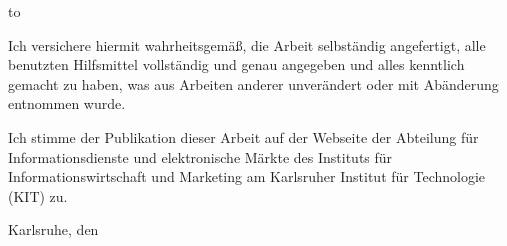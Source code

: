 \thispagestyle{empty}
\vspace*{36\baselineskip}
\hbox to \textwidth{\hrulefill}
\par
Ich versichere hiermit wahrheitsgem\"a{\ss}, die Arbeit selbst\"andig angefertigt, alle benutzten Hilfsmittel vollst\"andig und genau angegeben und alles kenntlich gemacht zu haben, was aus Arbeiten anderer unver\"andert oder mit Ab\"anderung entnommen wurde.

Ich stimme der Publikation dieser Arbeit auf der Webseite der Abteilung f\"ur Informationsdienste und elektronische M\"arkte des Instituts f\"ur Informationswirtschaft und Marketing am Karlsruher Institut f\"ur Technologie (KIT) zu.

Karlsruhe, den \usebox{\thesisenddatesave}

\clearpage




